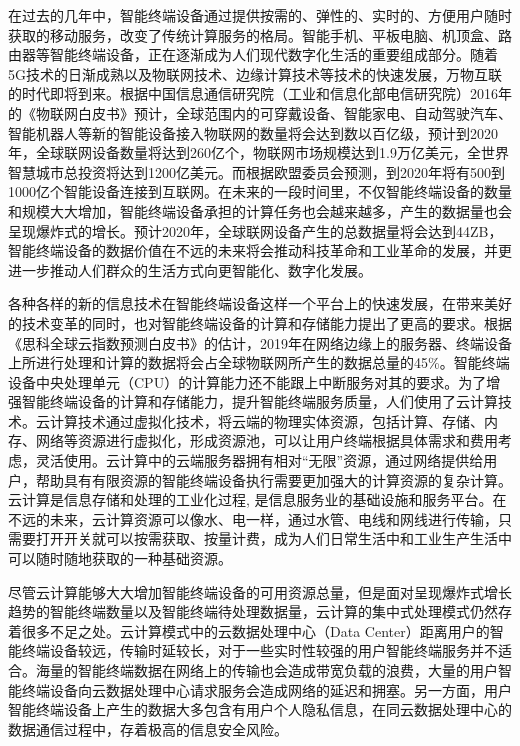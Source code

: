 在过去的几年中，智能终端设备通过提供按需的、弹性的、实时的、方便用户随时获取的移动服务，改变了传统计算服务的格局\citep{施巍松2017边缘计算}。智能手机、平板电脑、机顶盒、路由器等智能终端设备，正在逐渐成为人们现代数字化生活的重要组成部分。随着5G技术的日渐成熟以及物联网技术、边缘计算技术等技术的快速发展，万物互联的时代即将到来\cite{taleb2017mobile}。根据中国信息通信研究院（工业和信息化部电信研究院）2016年的《物联网白皮书》预计，全球范围内的可穿戴设备、智能家电、自动驾驶汽车、智能机器人等新的智能设备接入物联网的数量将会达到数以百亿级，预计到2020年，全球联网设备数量将达到260亿个，物联网市场规模达到1.9万亿美元，全世界智慧城市总投资将达到1200亿美元\citep{物联网白皮书2016}。而根据欧盟委员会预测，到2020年将有500到1000亿个智能设备连接到互联网\cite{sundmaeker2010vision}。在未来的一段时间里，不仅智能终端设备的数量和规模大大增加，智能终端设备承担的计算任务也会越来越多，产生的数据量也会呈现爆炸式的增长。预计2020年，全球联网设备产生的总数据量将会达到44ZB\citep{物联网白皮书2016}，智能终端设备的数据价值在不远的未来将会推动科技革命和工业革命的发展，并更进一步推动人们群众的生活方式向更智能化、数字化发展。

各种各样的新的信息技术在智能终端设备这样一个平台上的快速发展，在带来美好的技术变革的同时，也对智能终端设备的计算和存储能力提出了更高的要求。根据《思科全球云指数预测白皮书》的估计，2019年在网络边缘上的服务器、终端设备上所进行处理和计算的数据将会占全球物联网所产生的数据总量的45\%\citep{Cisco2016}。智能终端设备中央处理单元（CPU）的计算能力还不能跟上中断服务对其的要求\cite{dinh2013survey,othman2014survey,wang2015survey}。为了增强智能终端设备的计算和存储能力，提升智能终端服务质量，人们使用了云计算技术。云计算技术通过虚拟化技术，将云端的物理实体资源，包括计算、存储、内存、网络等资源进行虚拟化，形成资源池，可以让用户终端根据具体需求和费用考虑，灵活使用。云计算中的云端服务器拥有相对“无限”资源，通过网络提供给用户，帮助具有有限资源的智能终端设备执行需要更加强大的计算资源的复杂计算\citep{Noor.2018}。云计算是信息存储和处理的工业化过程, 是信息服务业的基础设施和服务平台\citep{江绵恒2010}。在不远的未来，云计算资源可以像水、电一样，通过水管、电线和网线进行传输，只需要打开开关就可以按需获取、按量计费，成为人们日常生活中和工业生产生活中可以随时随地获取的一种基础资源\citep{buyya2009cloud}。

尽管云计算能够大大增加智能终端设备的可用资源总量，但是面对呈现爆炸式增长趋势的智能终端数量以及智能终端待处理数据量，云计算的集中式处理模式仍然存着很多不足之处。云计算模式中的云数据处理中心（Data Center）距离用户的智能终端设备较远，传输时延较长，对于一些实时性较强的用户智能终端服务并不适合。海量的智能终端数据在网络上的传输也会造成带宽负载的浪费，大量的用户智能终端设备向云数据处理中心请求服务会造成网络的延迟和拥塞\citep{Ismail2016Evaluation}。另一方面，用户智能终端设备上产生的数据大多包含有用户个人隐私信息，在同云数据处理中心的数据通信过程中，存着极高的信息安全风险。

